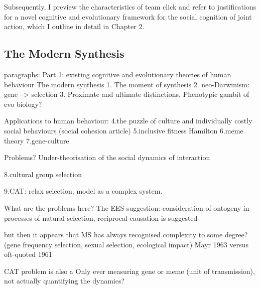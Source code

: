 Subsequently, I preview the characteristics of team click and refer to justifications for a novel cognitive and evolutionary framework for the social cognition of joint action, which I outline in detail in Chapter 2.


\subsection{The Modern Synthesis}

paragraphs:
Part 1: existing cognitive and evolutionary theories of human behaviour
The modern synthesis
    1. The moment of synthesis
    2. neo-Darwinism: gene --> selection
    3. Proximate and ultimate distinctions, Phenotypic gambit of evo biology?


Applications to human behaviour:
    4.the puzzle of culture and individually costly social behaviours (social cohesion article)
    5.inclusive fitness Hamilton
    6.meme theory
    7.gene-culture

Problems?
Under-theorisation of the social dynamics of interaction

    8.cultural group selection

    9.CAT: relax selection, model as a complex system.

What are the problems here?
  The EES suggestion: consideration of ontogeny in processes of natural selection, reciprocal causation is suggested

  but then it appears that MS has always recognised complexity to some degree?
   (gene frequency selection, sexual selection, ecological impact)
   Mayr 1963 versus oft-quoted 1961


  CAT problem is also a Only ever measuring gene or meme (unit of transmission), not actually quantifying the dynamics?

